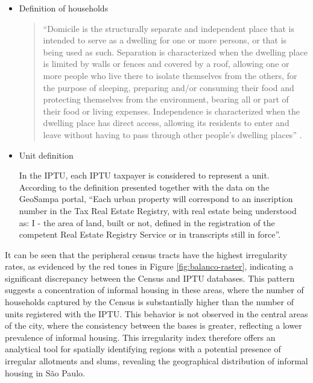 \begin{apendicesenv}
    \begin{itemize}
        \item Definition of households
        
        \begin{quote}
            ``Domicile is the structurally separate and independent place that is intended to serve as a dwelling for one or more persons, or that is being used as such. Separation is characterized when the dwelling place is limited by walls or fences and covered by a roof, allowing one or more people who live there to isolate themselves from the others, for the purpose of sleeping, preparing and/or consuming their food and protecting themselves from the environment, bearing all or part of their food or living expenses. Independence is characterized when the dwelling place has direct access, allowing its residents to enter and leave without having to pass through other people's dwelling places'' \cite{IBGE2013}.
        \end{quote}
    
        \item Unit definition
        
        In the IPTU, each IPTU taxpayer is considered to represent a unit. According to the definition presented together with the data on the GeoSampa portal, ``Each urban property will correspond to an inscription number in the Tax Real Estate Registry, with real estate being understood as: I - the area of land, built or not, defined in the registration of the competent Real Estate Registry Service or in transcripts still in force''.
    \end{itemize}
    
    
    It can be seen that the peripheral census tracts have the highest irregularity rates, as evidenced by the red tones in Figure \ref{fig:balanco-raster}, indicating a significant discrepancy between the Census and IPTU databases. This pattern suggests a concentration of informal housing in these areas, where the number of households captured by the Census is substantially higher than the number of units registered with the IPTU. This behavior is not observed in the central areas of the city, where the consistency between the bases is greater, reflecting a lower prevalence of informal housing. This irregularity index therefore offers an analytical tool for spatially identifying regions with a potential presence of irregular allotments and slums, revealing the geographical distribution of informal housing in São Paulo.
    

\end{apendicesenv}
